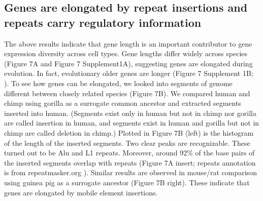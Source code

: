 \subsection{Genes are elongated by repeat insertions and repeats carry regulatory information}

The above results indicate that gene length is an important contributor to gene expression diversity across cell types. Gene lengths differ widely across species (Figure 7A and Figure 7 Supplement1A), suggesting genes are elongated during evolution. In fact, evolutionary older genes are longer (Figure 7 Supplement 1B; \cite{Grishkevich_2014}). To see how genes can be elongated, we looked into segments of genome different between closely related species (Figure 7B). We compared human and chimp using gorilla as a surrogate common ancestor and extracted segments inserted into human. (Segments exist only in human but not in chimp nor gorilla are called insertion in human, and segments exist in human and gorilla but not in chimp are called deletion in chimp.) Plotted in Figure 7B (left) is the histogram of the length of the inserted segments. Two clear peaks are recognizable. These turned out to be Alu and L1 repeats. Moreover, around 92\% of the base pairs of the inserted segments overlap with repeats (Figure 7A insert; repeats annotation is from repeatmasker.org \cite{Hubley_2015}). Similar results are observed in mouse/rat comparison using guinea pig as a surrogate ancestor (Figure 7B right). These indicate that genes are elongated by mobile element insertions. 

